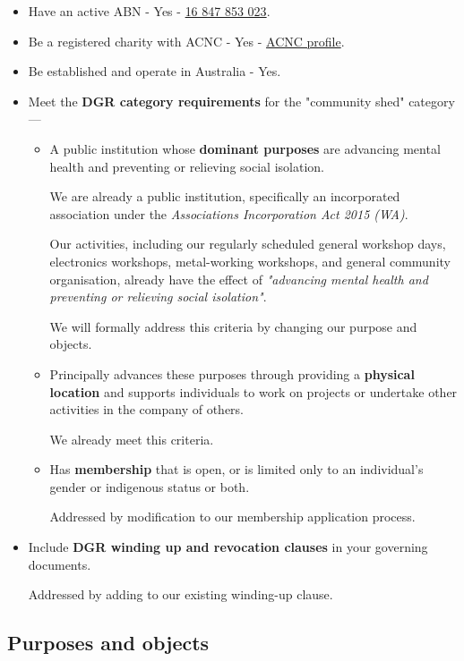 \documentclass[../constitution.tex]{subfiles}
\begin{document}
\begin{itemize}
    \item Have an active ABN - Yes - \href{https://abr.business.gov.au/ABN/View/16847853023}{16 847 853 023}.
    \item Be a registered charity with ACNC - Yes - \href{https://www.acnc.gov.au/charity/charities/705391a6-3aaf-e811-a963-000d3ad24077/profile}{ACNC profile}.
    \item Be established and operate in Australia - Yes.
    \item Meet the \textbf{DGR category requirements} for the "community shed" category ---
    \begin{itemize}
        \item A public institution whose \textbf{dominant purposes} are advancing mental health and preventing or relieving social isolation.
        
        We are already a public institution, specifically an incorporated association under the \textit{Associations Incorporation Act 2015 (WA)}.
        
        Our activities, including our regularly scheduled general workshop days, electronics workshops, metal-working workshops, and general community organisation, already have the effect of \textit{"advancing mental health and preventing or relieving social isolation"}.
        
        We will formally address this criteria by changing our purpose and objects.
        \item Principally advances these purposes through providing a \textbf{physical location} and supports individuals to work on projects or undertake other activities in the company of others.
        
        We already meet this criteria.
        \item Has \textbf{membership} that is open, or is limited only to an individual's gender or indigenous status or both.
        
        Addressed by modification to our membership application process.
    \end{itemize}
    \item Include \textbf{DGR winding up and revocation clauses} in your governing documents.
    
    Addressed by adding to our existing winding-up clause.
\end{itemize}

\subsection*{Purposes and objects}
\end{document}
